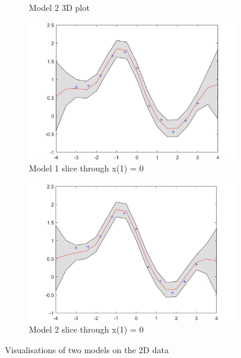 \documentclass[twoside,twocolumn]{article}
\begin{document}
\begin{figure}[h]
\begin{subfigure}[t]{0.49\linewidth}
        \caption{Model 2 3D plot}
        \label{sub:2d2}
    \end{subfigure}%
    \newline
    \begin{subfigure}[t]{0.49\linewidth}
        \centering
        \includegraphics[width=\textwidth]{c_1_5_3}
        \caption{Model 1 slice through x(1) = 0} 
        \label{sub:2d3}
    \end{subfigure}
    \begin{subfigure}[t]{0.49\linewidth}
        \centering
        \includegraphics[width=\textwidth]{c_1_5_4}
        \caption{Model 2 slice through x(1) = 0}
        \label{sub:2d4}
    \end{subfigure}
    \caption{Visualisations of two models on the 2D data}
    \label{fig:2d}
\end{figure}
\end{document}
